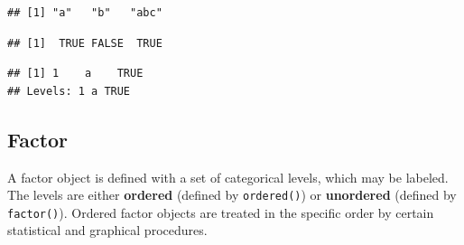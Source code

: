 \documentclass[]{book}
\newenvironment{Shaded}{\begin{snugshade}}{\end{snugshade}}
\newcommand{\NormalTok}[1]{{#1}}
\theoremstyle{definition}
\theoremstyle{definition}
\theoremstyle{remark}
\begin{document}
\begin{Shaded}
\end{Shaded}

\begin{verbatim}
## [1] "a"   "b"   "abc"
\end{verbatim}

\begin{Shaded}
\end{Shaded}

\begin{verbatim}
## [1]  TRUE FALSE  TRUE
\end{verbatim}

\begin{Shaded}
\end{Shaded}

\begin{verbatim}
## [1] 1    a    TRUE
## Levels: 1 a TRUE
\end{verbatim}

\subsection{Factor}\label{factor}

A factor object is defined with a set of categorical levels, which may
be labeled. The levels are either \textbf{ordered} (defined by
\texttt{ordered()}) or \textbf{unordered} (defined by
\texttt{factor()}). Ordered factor objects are treated in the specific
order by certain statistical and graphical procedures.
\end{document}
